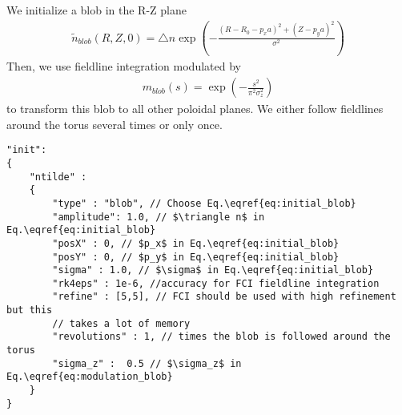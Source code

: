 We initialize a blob in the R-Z plane
\begin{align} \label{eq:initial_blob}
  \tilde n_{blob}(R,Z,0) = \triangle n \exp\left( -\frac{(R - R_0 - p_x a)^2 + (Z-p_ya)^2}{\sigma^2} \right)
\end{align}
Then, we use fieldline integration modulated by
\begin{align} \label{eq:modulation_blob}
  m_{blob}(s) = \exp\left( -\frac{s^2 }{\pi^2\sigma_z^2} \right)
\end{align}
to transform this blob to all other poloidal
planes.
We either follow fieldlines around the torus several times or only once.
\begin{verbatim}
"init":
{
    "ntilde" :
    {
        "type" : "blob", // Choose Eq.\eqref{eq:initial_blob}
        "amplitude": 1.0, // $\triangle n$ in Eq.\eqref{eq:initial_blob}
        "posX" : 0, // $p_x$ in Eq.\eqref{eq:initial_blob}
        "posY" : 0, // $p_y$ in Eq.\eqref{eq:initial_blob}
        "sigma" : 1.0, // $\sigma$ in Eq.\eqref{eq:initial_blob}
        "rk4eps" : 1e-6, //accuracy for FCI fieldline integration
        "refine" : [5,5], // FCI should be used with high refinement but this
        // takes a lot of memory
        "revolutions" : 1, // times the blob is followed around the torus
        "sigma_z" :  0.5 // $\sigma_z$ in Eq.\eqref{eq:modulation_blob}
    }
}
\end{verbatim}

